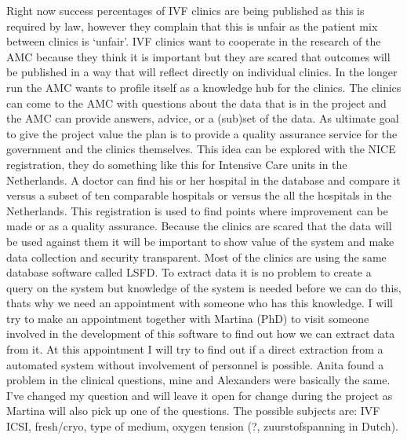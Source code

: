 



Right now success percentages of IVF clinics are being published as this is required by law, however they complain that this is unfair as the patient mix between clinics is ‘unfair’. 
IVF clinics want to cooperate in the research of the AMC because they think it is important but they are scared that outcomes will be published in a way that will reflect directly on individual clinics.
In the longer run the AMC wants to profile itself as a knowledge hub for the clinics. The clinics can come to the AMC with questions about the data that is in the project and the AMC can provide answers, advice, or a (sub)set of the data.
As ultimate goal to give the project value the plan is to provide a quality assurance service for the government and the clinics themselves.
This idea can be explored with the NICE registration, they do something like this for Intensive Care units in the Netherlands. 
A doctor can find his or her hospital in the database and compare it versus a subset of ten comparable hospitals or versus the all the hospitals in the Netherlands. 
This registration is used to find points where improvement can be made or as a quality assurance.
Because the clinics are scared that the data will be used against them it will be important to show value of the system and make data collection and security transparent.
Most of the clinics are using the same database software called LSFD. 
To extract data it is no problem to create a query on the system but knowledge of the system is needed before we can do this, thats why we need an appointment with someone who has this knowledge. 
I will try to make an appointment together with Martina (PhD) to visit someone involved in the development of this software to find out how we can extract data from it. 
At this appointment I will try to find out if a direct extraction from a automated system without involvement of personnel is possible.
Anita found a problem in the clinical questions, mine and Alexanders were basically the same. 
I’ve changed my question and will leave it open for change during the project as Martina will also pick up one of the questions. 
The possible subjects are: IVF ICSI, fresh/cryo, type of medium, oxygen tension (?, zuurstofspanning in Dutch).


